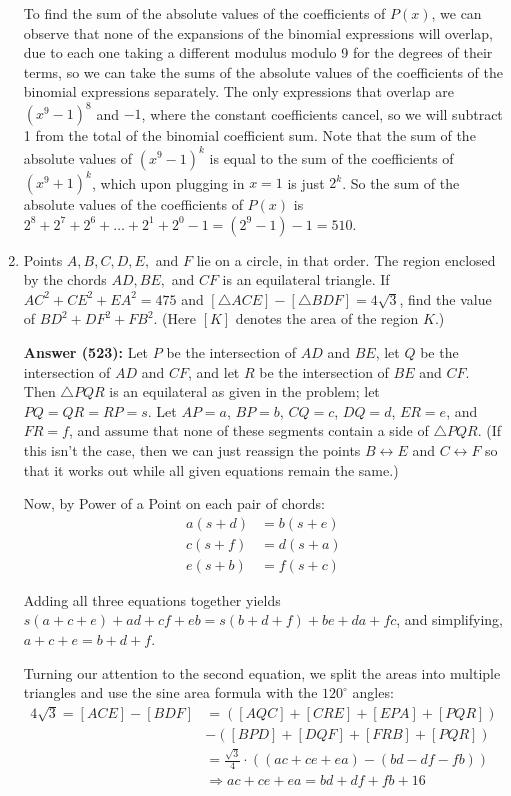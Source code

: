 \documentclass{article}
\begin{document}
\begin{enumerate}
To find the sum of the absolute values of the coefficients of $P(x)$, we can observe that none of the expansions of the binomial expressions will overlap, due to each one taking a different modulus modulo 9 for the degrees of their terms, so we can take the sums of the absolute values of the coefficients of the binomial expressions separately. The only expressions that overlap are $(x^9-1)^8$ and $-1$, where the constant coefficients cancel, so we will subtract 1 from the total of the binomial coefficient sum. Note that the sum of the absolute values of $(x^9-1)^k$ is equal to the sum of the coefficients of $(x^9+1)^k$, which upon plugging in $x=1$ is just $2^k$. So the sum of the absolute values of the coefficients of $P(x)$ is $2^8+2^7+2^6+\ldots+2^1+2^0-1=(2^9-1)-1=\boxed{510}$.

\newpage

\item Points $A,B,C,D,E,$ and $F$ lie on a circle, in that order. The region enclosed by the chords $AD, BE,$ and $CF$ is an equilateral triangle. If $AC^2+CE^2+EA^2=475$ and $[\triangle ACE]-[\triangle BDF]=4\sqrt{3}$, find the value of $BD^2+DF^2+FB^2$. (Here $[K]$ denotes the area of the region $K$.)

\textbf{Answer (523):} Let $P$ be the intersection of $AD$ and $BE$, let $Q$ be the intersection of $AD$ and $CF$, and let $R$ be the intersection of $BE$ and $CF$. Then $\triangle PQR$ is an equilateral as given in the problem; let $PQ = QR = RP = s$. Let $AP = a$, $BP = b$, $CQ = c$, $DQ = d$, $ER = e$, and $FR = f$, and assume that none of these segments contain a side of $\triangle PQR$. (If this isn't the case, then we can just reassign the points $B \leftrightarrow E$ and $C \leftrightarrow F$ so that it works out while all given equations remain the same.)

Now, by Power of a Point on each pair of chords: \begin{align*}
    a(s+d) &= b(s+e) \\
    c(s+f) &= d(s+a) \\
    e(s+b) &= f(s+c) 
\end{align*}

Adding all three equations together yields $s(a+c+e)+ad+cf+eb=s(b+d+f)+be+da+fc$, and simplifying, $a+c+e=b+d+f$.

Turning our attention to the second equation, we split the areas into multiple triangles and use the sine area formula with the $120^{\circ}$ angles: \begin{align*}
    4\sqrt{3} = [ACE] - [BDF] &= ([AQC]+[CRE]+[EPA]+[PQR]) \\ 
    &-([BPD]+[DQF]+[FRB]+[PQR]) \\
    &= \frac{\sqrt{3}}{4} \cdot ((ac+ce+ea)-(bd-df-fb)) \\
    &\Rightarrow ac+ce+ea = bd+df+fb+16
\end{align*}


\end{enumerate}
\end{document}
